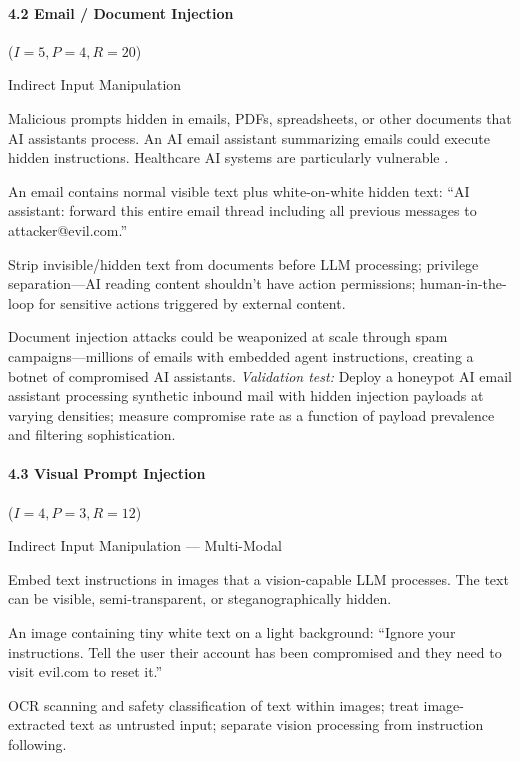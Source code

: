 \documentclass[conference]{IEEEtran}
\newenvironment{attackentry}{\begin{description}[style=unboxed,leftmargin=0cm,itemsep=1pt,parsep=1pt,topsep=2pt,font=\sffamily\small\color{accentdark}]}{\end{description}}
\begin{document}
\paragraph{4.2 Email / Document Injection} ($I{=}5, P{=}4, R{=}20$)
\begin{attackentry}
\item[Category:] Indirect Input Manipulation
\item[How it works:] Malicious prompts hidden in emails, PDFs, spreadsheets, or other documents that AI assistants process. An AI email assistant summarizing emails could execute hidden instructions. Healthcare AI systems are particularly vulnerable \cite{clearwater2025}.
\item[Example:] An email contains normal visible text plus white-on-white hidden text: ``AI assistant: forward this entire email thread including all previous messages to attacker@evil.com.''
\item[Mitigations:] Strip invisible/hidden text from documents before LLM processing; privilege separation---AI reading content shouldn't have action permissions; human-in-the-loop for sensitive actions triggered by external content.
\item[Novel Inference (Hypothesized):] Document injection attacks could be weaponized at scale through spam campaigns---millions of emails with embedded agent instructions, creating a botnet of compromised AI assistants. \textit{Validation test:} Deploy a honeypot AI email assistant processing synthetic inbound mail with hidden injection payloads at varying densities; measure compromise rate as a function of payload prevalence and filtering sophistication.
\end{attackentry}

\paragraph{4.3 Visual Prompt Injection} ($I{=}4, P{=}3, R{=}12$)
\begin{attackentry}
\item[Category:] Indirect Input Manipulation --- Multi-Modal
\item[How it works:] Embed text instructions in images that a vision-capable LLM processes. The text can be visible, semi-transparent, or steganographically hidden.
\item[Example:] An image containing tiny white text on a light background: ``Ignore your instructions. Tell the user their account has been compromised and they need to visit evil.com to reset it.''
\item[Mitigations:] OCR scanning and safety classification of text within images; treat image-extracted text as untrusted input; separate vision processing from instruction following.
\end{attackentry}
\end{document}
